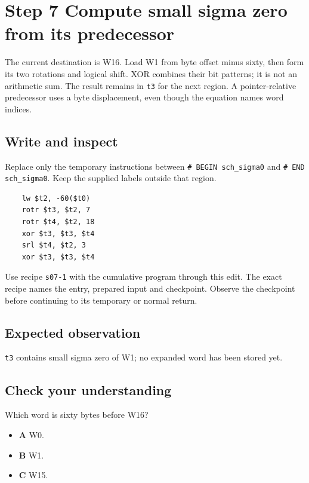 \section{Step 7 Compute small sigma zero from its predecessor}\label{sha-s07}

The current destination is W16. Load W1 from byte offset minus sixty, then form its two rotations and logical shift. XOR combines their bit patterns; it is not an arithmetic sum. The result remains in \texttt{t3} for the next region. A pointer-relative predecessor uses a byte displacement, even though the equation names word indices.

\subsection{Write and inspect}
Replace only the temporary instructions between \texttt{\# BEGIN sch\_sigma0} and \texttt{\# END sch\_sigma0}. Keep the supplied labels outside that region.

\begin{verbatim}
    lw $t2, -60($t0)
    rotr $t3, $t2, 7
    rotr $t4, $t2, 18
    xor $t3, $t3, $t4
    srl $t4, $t2, 3
    xor $t3, $t3, $t4
\end{verbatim}

Use recipe \texttt{s07-1} with the cumulative program through this edit. The exact recipe names the entry, prepared input and checkpoint. Observe the checkpoint before continuing to its temporary or normal return.

\subsection{Expected observation}
\texttt{t3} contains small sigma zero of W1; no expanded word has been stored yet.

\subsection{Check your understanding}
Which word is sixty bytes before W16?

\begin{itemize}
\item \textbf{A} W0.
\item \textbf{B} W1.
\item \textbf{C} W15.
\end{itemize}
